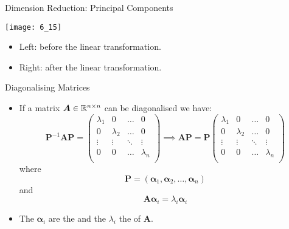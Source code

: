 \documentclass[mathserif, aspectratio=169]{beamer}
\begin{document}
\begin{frame}{Dimension Reduction: Principal Components}
	\vspace{-8mm}
	\begin{center}
		\texttt{[image: 6\_15]}
	\end{center}
	\vspace{-6mm}
	\begin{itemize}
		\item Left: before the linear transformation.
		\item Right: after the linear transformation.
	\end{itemize}
\end{frame}

\begin{frame}{Diagonalising Matrices}
	\begin{itemize}
		\item If a matrix $\bm{A} \in \mathbb{R}^{n\times n}$ can be diagonalised we have:
			\[
				\bm{P}^{-1}\bm{A P} =
				\begin{pmatrix}
					\lambda_1 & 0 & \dots & 0 \\ 
					0 & \lambda_2 & \dots & 0 \\ 
					\vdots & \vdots & \ddots & \vdots \\
					0 & 0 & \dots & \lambda_n \\ 
				\end{pmatrix}
				\implies
				\bm{A P} = \bm{P}
				\begin{pmatrix}
					\lambda_1 & 0 & \dots & 0 \\ 
					0 & \lambda_2 & \dots & 0 \\ 
					\vdots & \vdots & \ddots & \vdots \\
					0 & 0 & \dots & \lambda_n \\ 
				\end{pmatrix}
			\]
			where
			\[ \bm{P} = (\bm{\alpha}_1, \bm{\alpha}_2, \dots, \bm{\alpha}_n) \]
			and
			\[ \bm{A}\bm{\alpha}_i = \lambda_i \bm{\alpha}_i \]
		\item The $\bm{\alpha}_i$ are the  and the $\lambda_i$ the 
			 of $\bm{A}$.
	\end{itemize}
\end{frame}
\end{document}
